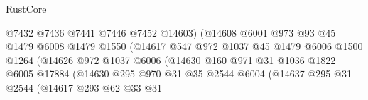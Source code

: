 \begin{lexlean}{RustCore}
\begin{coremodule}
                                        @7432
                                        @7436
                                        @7441
                                        @7446
                                        @7452
                                        @14603)
                                      (@14608
                                        @6001
                                        @973
                                        @93
                                        @45
                                        @1479
                                        @6008
                                        @1479
                                        @1550
                                        (@14617
                                          @547
                                          @972
                                          @1037
                                          @45
                                          @1479
                                          @6006
                                          @1500
                                          @1264
                                          (@14626
                                            @972
                                            @1037
                                            @6006
                                            (@14630
                                              @160
                                              @971
                                              @31
                                              @1036
                                              @1822
                                              @6005
                                              @17884
                                              (@14630
                                                @295
                                                @970
                                                @31
                                                @35
                                                @2544
                                                @6004
                                                (@14637
                                                  @295
                                                  @31
                                                  @2544
                                                  (@14617
                                                    @293
                                                    @62
                                                    @33
                                                    @31

\end{coremodule}
\end{lexlean}
